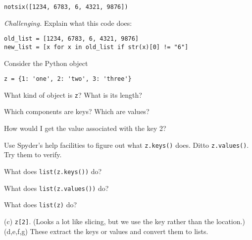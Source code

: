 \documentclass[11pt]{exam}
\begin{document}
\begin{questions}
\begin{solution}
\begin{verbatim}
notsix([1234, 6783, 6, 4321, 9876])
\end{verbatim}
\end{solution}


\item {\it Challenging.\/}
 Explain what this code does:
\begin{verbatim}
old_list = [1234, 6783, 6, 4321, 9876]
new_list = [x for x in old_list if str(x)[0] != "6"]
\end{verbatim}

\item Consider the Python object
\begin{verbatim}
z = {1: 'one', 2: 'two', 3: 'three'}
\end{verbatim}
\begin{parts}
\item What kind of object is {\tt z}?  What is its length?
\item Which components are keys?  Which are values?
\item How would I get the value associated with the key 2?
\item Use Spyder's help facilities to figure out what {\tt z.keys()} does.
Ditto {\tt z.values()}.  Try them to verify.
\item What does {\tt list(z.keys())} do?
\item What does {\tt list(z.values())} do?
\item What does {\tt list(z)} do?
\end{parts}

\begin{solution}
(c) \verb|z[2]|.  (Looks a lot like slicing, but we use the key rather than the location.)
(d,e,f,g) These extract the keys or values and convert them to lists.
\end{solution}




\end{questions}
\end{document}
